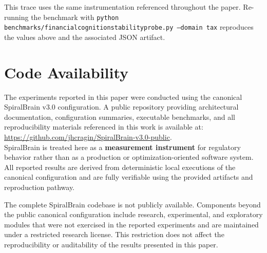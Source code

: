 \documentclass[12pt,a4paper]{article}
\begin{document}
This trace uses the same instrumentation referenced throughout the paper. Re-running the benchmark with \texttt{python benchmarks/financial\textunderscore cognition\textunderscore stability\textunderscore probe.py --domain tax} reproduces the values above and the associated JSON artifact.

\section{Code Availability}

The experiments reported in this paper were conducted using the canonical SpiralBrain v3.0 configuration. A public repository providing architectural documentation, configuration summaries, executable benchmarks, and all reproducibility materials referenced in this work is available at:
\\
\url{https://github.com/jhcragin/SpiralBrain-v3.0-public}.
\\

SpiralBrain is treated here as a \textbf{measurement instrument} for regulatory behavior rather than as a production or optimization-oriented software system. All reported results are derived from deterministic local executions of the canonical configuration and are fully verifiable using the provided artifacts and reproduction pathway.

The complete SpiralBrain codebase is not publicly available. Components beyond the public canonical configuration include research, experimental, and exploratory modules that were not exercised in the reported experiments and are maintained under a restricted research license. This restriction does not affect the reproducibility or auditability of the results presented in this paper.




\end{document}
